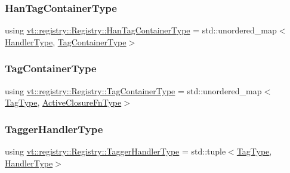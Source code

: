 \mbox{\label{structvt_1_1registry_1_1_registry_ab5d336044aee749d39c8feabe4fa6983}} 
\subsubsection{\texorpdfstring{Han\+Tag\+Container\+Type}{HanTagContainerType}}
{\footnotesize\ttfamily using \hyperlink{structvt_1_1registry_1_1_registry_ab5d336044aee749d39c8feabe4fa6983}{vt\+::registry\+::\+Registry\+::\+Han\+Tag\+Container\+Type} =  std\+::unordered\+\_\+map$<$\hyperlink{namespacevt_af64846b57dfcaf104da3ef6967917573}{Handler\+Type}, \hyperlink{structvt_1_1registry_1_1_registry_abefc9cdcc8557c5d547dd3ae44ae0996}{Tag\+Container\+Type}$>$}

\mbox{\label{structvt_1_1registry_1_1_registry_abefc9cdcc8557c5d547dd3ae44ae0996}} 
\subsubsection{\texorpdfstring{Tag\+Container\+Type}{TagContainerType}}
{\footnotesize\ttfamily using \hyperlink{structvt_1_1registry_1_1_registry_abefc9cdcc8557c5d547dd3ae44ae0996}{vt\+::registry\+::\+Registry\+::\+Tag\+Container\+Type} =  std\+::unordered\+\_\+map$<$\hyperlink{namespacevt_a84ab281dae04a52a4b243d6bf62d0e52}{Tag\+Type}, \hyperlink{namespacevt_a2a06c34cafcd511828f16cbf1476b924}{Active\+Closure\+Fn\+Type}$>$}

\mbox{\label{structvt_1_1registry_1_1_registry_aed8ec48ac909aea3e4dbc21aa6f8e898}} 
\subsubsection{\texorpdfstring{Tagger\+Handler\+Type}{TaggerHandlerType}}
{\footnotesize\ttfamily using \hyperlink{structvt_1_1registry_1_1_registry_aed8ec48ac909aea3e4dbc21aa6f8e898}{vt\+::registry\+::\+Registry\+::\+Tagger\+Handler\+Type} =  std\+::tuple$<$\hyperlink{namespacevt_a84ab281dae04a52a4b243d6bf62d0e52}{Tag\+Type}, \hyperlink{namespacevt_af64846b57dfcaf104da3ef6967917573}{Handler\+Type}$>$}



